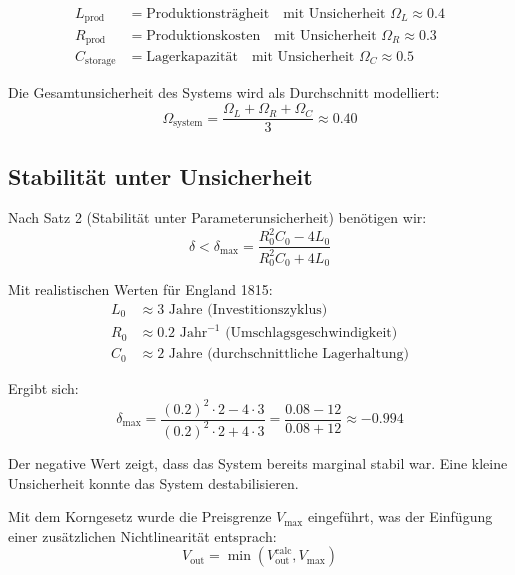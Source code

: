\documentclass[a4paper,12pt,twoside]{report}
\theoremstyle{definition}
\begin{document}
\begin{align}
L_{\text{prod}} &= \text{Produktionsträgheit} \quad \text{mit Unsicherheit } \Omega_L \approx 0.4\\
R_{\text{prod}} &= \text{Produktionskosten} \quad \text{mit Unsicherheit } \Omega_R \approx 0.3 \\
C_{\text{storage}} &= \text{Lagerkapazität} \quad \text{mit Unsicherheit } \Omega_C \approx 0.5
\end{align}

Die Gesamtunsicherheit des Systems wird als Durchschnitt modelliert:
\begin{equation}
\Omega_{\text{system}} = \frac{\Omega_L + \Omega_R + \Omega_C}{3} \approx 0.40
\end{equation}

\subsection{Stabilität unter Unsicherheit}

Nach Satz 2 (Stabilität unter Parameterunsicherheit) benötigen wir:
\begin{equation}
\delta < \delta_{\max} = \frac{R_0^2 C_0 - 4L_0}{R_0^2 C_0 + 4L_0}
\end{equation}

Mit realistischen Werten für England 1815:
\begin{align}
L_0 &\approx 3 \text{ Jahre (Investitionszyklus)} \\
R_0 &\approx 0.2 \text{ Jahr}^{-1} \text{ (Umschlagsgeschwindigkeit)} \\
C_0 &\approx 2 \text{ Jahre (durchschnittliche Lagerhaltung)}
\end{align}

Ergibt sich:
\begin{equation}
\delta_{\max} = \frac{(0.2)^2 \cdot 2 - 4 \cdot 3}{(0.2)^2 \cdot 2 + 4 \cdot 3} = \frac{0.08 - 12}{0.08 + 12} \approx -0.994
\end{equation}

Der negative Wert zeigt, dass das System bereits marginal stabil war. Eine kleine Unsicherheit konnte das System destabilisieren.

Mit dem Korngesetz wurde die Preisgrenze $V_{\max}$ eingeführt, was der Einfügung einer zusätzlichen Nichtlinearität entsprach:
\begin{equation}
V_{\text{out}} = \min(V_{\text{out}}^{\text{calc}}, V_{\max})
\end{equation}
\end{document}
